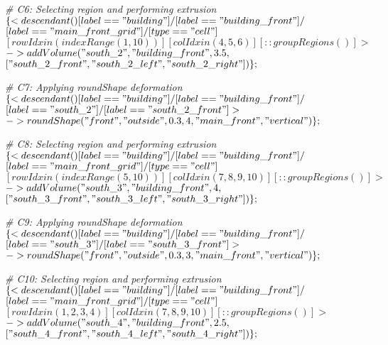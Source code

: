 \noindent \textit{\# C6: Selecting region and performing extrusion}\\
$\{< descendant() [label=="building"] / [label=="building\_front"] / $\\
$[label=="main\_front\_grid"] / [type=="cell"] $\\
$[rowIdx in (indexRange(1, 10))] [colIdx in (4, 5, 6)] [::groupRegions()] > $\\
$-> addVolume("south\_2", "building\_front", 3.5, $\\
$["south\_2\_front", "south\_2\_left", "south\_2\_right"])\};$

\noindent \textit{\# C7: Applying roundShape deformation}\\
$\{< descendant() [label=="building"] / [label=="building\_front"] / $\\
$[label=="south\_2"] / [label=="south\_2\_front"] > $\\
$-> roundShape("front", "outside", 0.3, 4, "main\_front", "vertical")\};$

\noindent \textit{\# C8: Selecting region and performing extrusion}\\
$\{< descendant() [label=="building"] / [label=="building\_front"] / $\\
$[label=="main\_front\_grid"] / [type=="cell"] $\\
$[rowIdx in (indexRange(5, 10))] [colIdx in (7, 8, 9, 10)] [::groupRegions()] > $\\
$-> addVolume("south\_3", "building\_front", 4, $\\
$["south\_3\_front", "south\_3\_left", "south\_3\_right"])\};$

\noindent \textit{\# C9: Applying roundShape deformation}\\
$\{< descendant() [label=="building"] / [label=="building\_front"] / $\\
$[label=="south\_3"] / [label=="south\_3\_front"] > $\\
$-> roundShape("front", "outside", 0.3, 3, "main\_front", "vertical")\};$

\noindent \textit{\# C10: Selecting region and performing extrusion}\\
$\{< descendant() [label=="building"] / [label=="building\_front"] / $\\
$[label=="main\_front\_grid"] / [type=="cell"] $\\
$[rowIdx in (1, 2, 3, 4)] [colIdx in (7, 8, 9, 10)] [::groupRegions()] > $\\
$-> addVolume("south\_4", "building\_front", 2.5, $\\
$["south\_4\_front", "south\_4\_left", "south\_4\_right"])\};$

